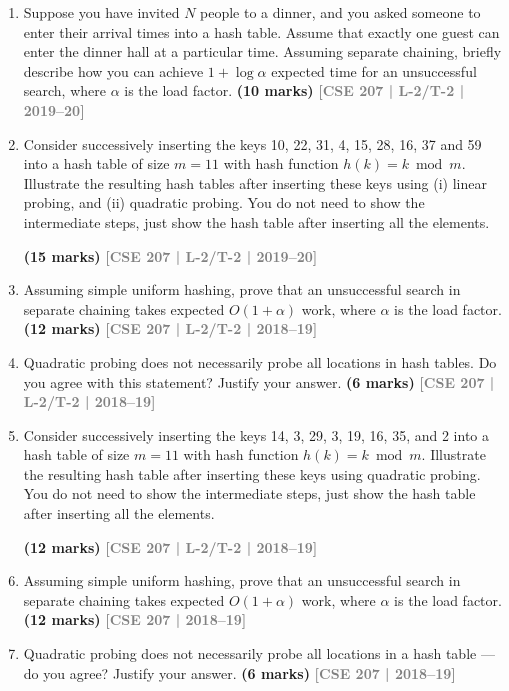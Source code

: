\documentclass[12pt,a3paper]{article}
\newcommand{\yr}[1]{\hfill\textcolor{gray}{\small\textbf{[#1]}}}
\newcommand{\mk}[1]{\textcolor{orange!70!black}{\small\textbf{(#1 marks)}}}
\begin{document}
\begin{enumerate}
\item Suppose you have invited $N$ people to a dinner, and you asked someone to enter their arrival times into a hash table. Assume that exactly one guest can enter the dinner hall at a particular time. Assuming separate chaining, briefly describe how you can achieve $1 + \log \alpha$ expected time for an unsuccessful search, where $\alpha$ is the load factor.
\mk{10} \yr{CSE 207 | L-2/T-2 | 2019--20}

\item Consider successively inserting the keys 10, 22, 31, 4, 15, 28, 16, 37 and 59 into a hash table of size $m = 11$ with hash function $h(k) = k \bmod m$. Illustrate the resulting hash tables after inserting these keys using (i) linear probing, and (ii) quadratic probing. You do not need to show the intermediate steps, just show the hash table after inserting all the elements.
 
\mk{15} \yr{CSE 207 | L-2/T-2 | 2019--20}

\item Assuming simple uniform hashing, prove that an unsuccessful search in separate chaining takes expected $O(1 + \alpha)$ work, where $\alpha$ is the load factor.
\mk{12} \yr{CSE 207 | L-2/T-2 | 2018--19}

\item Quadratic probing does not necessarily probe all locations in hash tables. Do you agree with this statement? Justify your answer.
\mk{6} \yr{CSE 207 | L-2/T-2 | 2018--19}

\item Consider successively inserting the keys 14, 3, 29, 3, 19, 16, 35, and 2 into a hash table of size $m = 11$ with hash function $h(k) = k \bmod m$. Illustrate the resulting hash table after inserting these keys using quadratic probing. You do not need to show the intermediate steps, just show the hash table after inserting all the elements.
 
\mk{12} \yr{CSE 207 | L-2/T-2 | 2018--19}


\item Assuming simple uniform hashing, prove that an unsuccessful search in separate chaining takes expected $O(1 + \alpha)$ work, where $\alpha$ is the load factor. \mk{12}
\yr{CSE 207 | 2018--19}


\item Quadratic probing does not necessarily probe all locations in a hash table --- do you agree? Justify your answer. \mk{6}
\yr{CSE 207 | 2018--19}


\end{enumerate}
\end{document}
